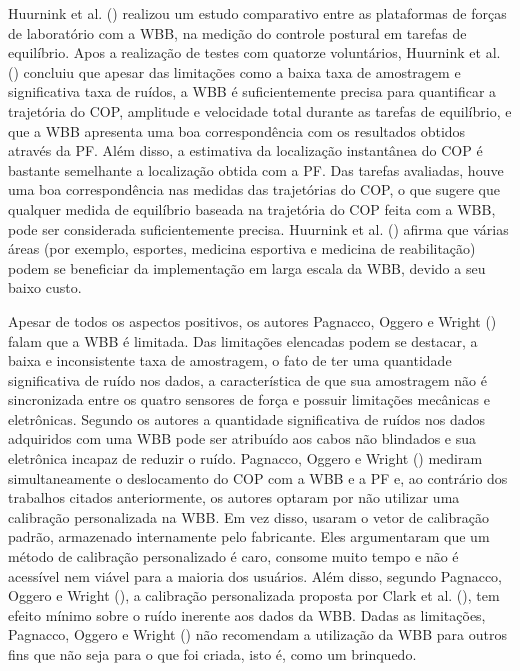 Huurnink et al. (\citeyear{huurnink2013comparison}) realizou um estudo comparativo entre as plataformas de forças de laboratório com a WBB, na medição do controle postural em tarefas de equilíbrio. Apos a realização de testes com quatorze voluntários, Huurnink et al. (\citeyear{huurnink2013comparison}) concluiu que apesar das limitações como a baixa taxa de amostragem e significativa taxa de ruídos, a WBB é suficientemente precisa para quantificar a trajetória do COP, amplitude e velocidade total durante as
tarefas de equilíbrio, e que a WBB apresenta uma boa correspondência com os resultados obtidos através da PF. Além disso, a estimativa da localização instantânea do COP é bastante semelhante a localização obtida com a PF. Das tarefas avaliadas, houve uma boa correspondência nas medidas das trajetórias do COP, o que sugere que qualquer medida de equilíbrio baseada na trajetória do COP feita com a WBB, pode ser considerada suficientemente precisa. Huurnink et al. (\citeyear{huurnink2013comparison}) afirma que várias áreas (por exemplo, esportes, medicina esportiva e medicina de reabilitação) podem se beneficiar da implementação em larga escala da WBB, devido a seu baixo custo.

Apesar de todos os aspectos positivos, os autores  Pagnacco, Oggero e Wright (\citeyear{pagnacco2011biomedical}) falam que a WBB é limitada. Das limitações elencadas podem se destacar, a baixa e inconsistente taxa de amostragem, o fato de ter uma quantidade significativa de ruído nos dados, a característica de que sua amostragem não é sincronizada entre os quatro sensores de força e possuir limitações mecânicas e eletrônicas. Segundo os autores a quantidade significativa de ruídos nos dados adquiridos com uma WBB pode ser atribuído aos cabos não blindados e sua eletrônica incapaz de reduzir o ruído. Pagnacco, Oggero e Wright (\citeyear{pagnacco2011biomedical}) mediram simultaneamente o deslocamento do COP com a WBB e a PF e, ao contrário dos trabalhos citados anteriormente, os autores optaram por não utilizar uma calibração personalizada na WBB. Em vez disso, usaram o vetor de calibração padrão, armazenado internamente pelo fabricante. Eles argumentaram que um método de calibração personalizado é caro, consome muito tempo e não é acessível nem viável para a maioria dos usuários. Além disso, segundo Pagnacco, Oggero e Wright (\citeyear{pagnacco2011biomedical}), a calibração personalizada proposta por Clark et al. (\citeyear{clark2010validity}), tem efeito mínimo sobre o ruído inerente aos dados da WBB. Dadas as limitações, Pagnacco, Oggero e Wright (\citeyear{pagnacco2011biomedical}) não recomendam a utilização da WBB para outros fins que não seja para o que foi criada, isto é, como um brinquedo.

